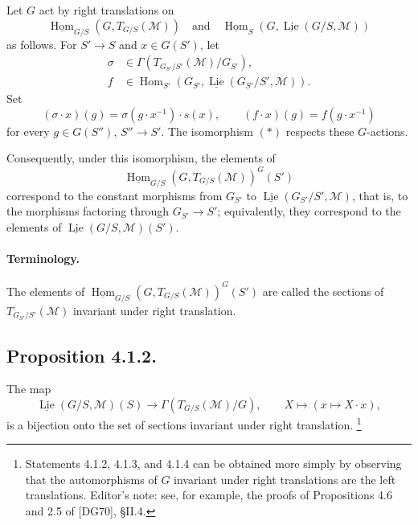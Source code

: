 Let \(G\) act by right translations on
\[
 \underline{\operatorname{Hom}}_{G/S}(G,T_{G/S}(\mathcal M))
 \quad\text{and}\quad
 \underline{\operatorname{Hom}}_S
   (G,\underline{\operatorname{Lie}}(G/S,\mathcal M))
\]
as follows. For \(S'\to S\) and \(x\in G(S')\), let
\[
\begin{aligned}
 \sigma&\in\Gamma(T_{G_{S'}/S'}(\mathcal M)/G_{S'}),\\
 f&\in\operatorname{Hom}_{S'}
 (G_{S'},\underline{\operatorname{Lie}}(G_{S'}/S',\mathcal M)).
\end{aligned}
\]
Set
\[
 (\sigma\cdot x)(g)=\sigma(g\cdot x^{-1})\cdot s(x),
 \qquad
 (f\cdot x)(g)=f(g\cdot x^{-1})
\]
for every \(g\in G(S'')\), \(S''\to S'\). The isomorphism \((*)\)
respects these \(G\)-actions.

Consequently, under this isomorphism, the elements of
\[
 \underline{\operatorname{Hom}}_{G/S}
   (G,T_{G/S}(\mathcal M))^G(S')
\]
correspond to the constant morphisms from \(G_{S'}\) to
\(\underline{\operatorname{Lie}}(G_{S'}/S',\mathcal M)\), that is, to
the morphisms factoring through \(G_{S'}\to S'\); equivalently, they
correspond to the elements of
\(\underline{\operatorname{Lie}}(G/S,\mathcal M)(S')\).

\paragraph{Terminology.}
The elements of
\(\underline{\operatorname{Hom}}_{G/S}
(G,T_{G/S}(\mathcal M))^G(S')\) are called the sections of
\(T_{G_{S'}/S'}(\mathcal M)\) invariant under right translation.

\subsection*{Proposition 4.1.2.}
The map
\[
 \underline{\operatorname{Lie}}(G/S,\mathcal M)(S)
 \longrightarrow \Gamma(T_{G/S}(\mathcal M)/G),
 \qquad X\longmapsto (x\mapsto X\cdot x),
\]
is a bijection onto the set of sections invariant under right
translation.
\footnote{Statements 4.1.2, 4.1.3, and 4.1.4 can be obtained more simply
by observing that the automorphisms of \(G\) invariant under right
translations are the left translations. Editor's note: see, for example,
the proofs of Propositions 4.6 and 2.5 of \textup{[DG70]}, \S II.4.}


